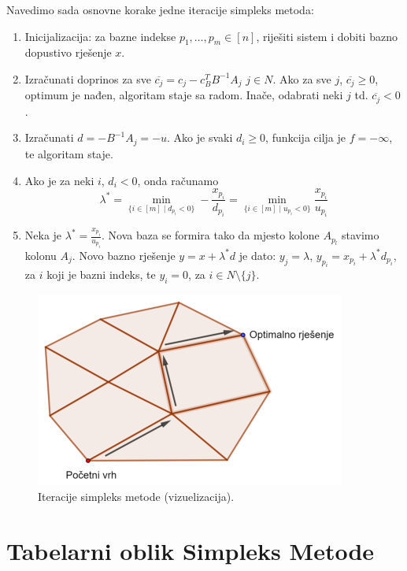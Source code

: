 \documentclass[a4paper, utf8, 11pt, colorlinks]{book}
\begin{document}
Navedimo sada osnovne korake jedne iteracije simpleks metoda:
\begin{enumerate}
    \item Inicijalizacija: za bazne indekse $p_1,\ldots,p_m \in [n]$, riješiti sistem i dobiti bazno dopustivo rješenje $x$. 
    \item Izračunati doprinos za sve $\overline{c_j} = c_j - c_B^T B^{-1}A_j $
          $j \in N$. Ako za sve $j$, $\overline{c_j} \geq 0$, optimum je nađen, algoritam staje sa radom. Inače, odabrati neki $j$  td. $\overline{c_j}<0$.
    \item Izračunati $d = -B^{-1}A_j = -u$. Ako je svaki $d_i \geq  0$, funkcija cilja je $f = - \infty$, te algoritam staje. 
    \item Ako je za neki $i$, $d_i < 0$, onda računamo 
             $$ \lambda^* = \min_{ \{i\in [m] \mid d_{p_i} < 0  \}} - \frac{x_{p_i}}{d_{p_i}} =  \min_{ \{i\in [m] \mid u_{p_i} < 0  \}} \frac{x_{p_i}}{u_{p_i}} $$
    \item Neka je $\lambda^* = \frac{x_{p_i}}{u_{p_i}}$. Nova baza se formira tako da mjesto kolone $A_{p_l}$ stavimo kolonu $A_j$. Novo bazno rješenje 
    $y = x + \lambda^*d $ je dato: $y_j = \lambda$, $y_{p_i} = x_{p_i} + \lambda^* d_{p_i}$, za $i$ koji je bazni indeks, te $y_i = 0$, za $i \in N \setminus \{j\}$. 
\end{enumerate}

\begin{figure}[!ht]
	\centering
   \includegraphics[scale=1.5]{simpleks_move.eps}\vspace{-2cm}
    \caption{Iteracije simpleks metode (vizuelizacija).}
    \label{fig:simpleks-visuelisation}
\end{figure}

\section{Tabelarni oblik Simpleks Metode}
\end{document}
